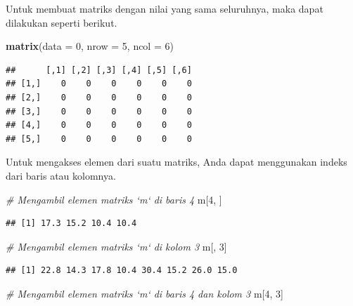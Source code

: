 \documentclass[]{book}
\newenvironment{Shaded}{\begin{snugshade}}{\end{snugshade}}
\newcommand{\CommentTok}[1]{\textcolor[rgb]{0.56,0.35,0.01}{\textit{#1}}}
\newcommand{\DataTypeTok}[1]{\textcolor[rgb]{0.13,0.29,0.53}{#1}}
\newcommand{\DecValTok}[1]{\textcolor[rgb]{0.00,0.00,0.81}{#1}}
\newcommand{\KeywordTok}[1]{\textcolor[rgb]{0.13,0.29,0.53}{\textbf{#1}}}
\newcommand{\NormalTok}[1]{#1}
\begin{document}
Untuk membuat matriks dengan nilai yang sama seluruhnya, maka dapat dilakukan seperti berikut.

\begin{Shaded}
\begin{Highlighting}[]
\KeywordTok{matrix}\NormalTok{(}\DataTypeTok{data =} \DecValTok{0}\NormalTok{, }\DataTypeTok{nrow =} \DecValTok{5}\NormalTok{, }\DataTypeTok{ncol =} \DecValTok{6}\NormalTok{)}
\end{Highlighting}
\end{Shaded}

\begin{verbatim}
##      [,1] [,2] [,3] [,4] [,5] [,6]
## [1,]    0    0    0    0    0    0
## [2,]    0    0    0    0    0    0
## [3,]    0    0    0    0    0    0
## [4,]    0    0    0    0    0    0
## [5,]    0    0    0    0    0    0
\end{verbatim}

Untuk mengakses elemen dari suatu matriks, Anda dapat menggunakan indeks dari baris atau kolomnya.

\begin{Shaded}
\begin{Highlighting}[]
\CommentTok{# Mengambil elemen matriks `m` di baris 4}
\NormalTok{m[}\DecValTok{4}\NormalTok{, ]}
\end{Highlighting}
\end{Shaded}

\begin{verbatim}
## [1] 17.3 15.2 10.4 10.4
\end{verbatim}

\begin{Shaded}
\begin{Highlighting}[]
\CommentTok{# Mengambil elemen matriks `m` di kolom 3}
\NormalTok{m[, }\DecValTok{3}\NormalTok{]}
\end{Highlighting}
\end{Shaded}

\begin{verbatim}
## [1] 22.8 14.3 17.8 10.4 30.4 15.2 26.0 15.0
\end{verbatim}

\begin{Shaded}
\begin{Highlighting}[]
\CommentTok{# Mengambil elemen matriks `m` di baris 4 dan kolom 3}
\NormalTok{m[}\DecValTok{4}\NormalTok{, }\DecValTok{3}\NormalTok{]}
\end{Highlighting}
\end{Shaded}
\end{document}
